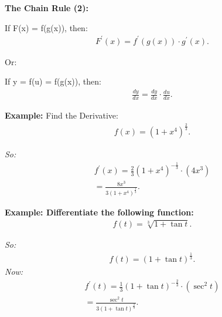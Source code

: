 \documentclass{report}
\begin{document}
  \bigbreak \noindent \bigbreak \noindent 
  \begin{Large}
    \textbf{The Chain Rule (2):}
  \end{Large}
  \bigbreak \noindent 
  If F(x) = f(g(x)), then:
  \begin{align*}
    F^{\prime}(x) = f^{\prime}(g(x)) \cdot g^{\prime}(x)
  .\end{align*}
  \begin{center}
    Or:
  \end{center}
  \bigbreak \noindent 
  If y = f(u) = f(g(x)), then:
  \begin{align*}
    \frac{dy}{dx} = \frac{dy}{dx} \cdot \frac{du}{dx}
  .\end{align*}

  \bigbreak \noindent 
  \begin{mdframed}
    \textbf{Example:} Find the Derivative:
    \begin{align*}
      f(x) = (1+x^{4})^{\frac{2}{3}}
    .\end{align*}
  \end{mdframed}
  \bigbreak \noindent 
  \textit{So:}
  \begin{align*}
    f^{\prime}(x)=\frac{2}{3}(1+x^{4})^{-\frac{1}{3}} \cdot (4x^{3}) \\ 
    = \frac{8x^{3}}{3(1+x^{4})^{\frac{1}{3}}}
  .\end{align*}

  \bigbreak \noindent 
  \begin{mdframed}
    \textbf{Example: Differentiate the following function:}
    \begin{align*}
      f(t) = \sqrt[3]{1+\tan{t}}
    .\end{align*}
  \end{mdframed}
  \bigbreak \noindent 
  \textit{So:}
  \begin{align*}
    f(t) = (1+\tan{t})^{\frac{1}{3}}
  .\end{align*}
  \bigbreak \noindent 
  \textit{Now:}
  \begin{align*}
    f^{\prime}(t) = \frac{1}{3}(1+\tan{t})^{-\frac{2}{3}} \cdot (\sec^2{t}) \\ 
    = \frac{\sec^{2}{t}}{3(1+\tan{t})^{\frac{2}{3}}}
  .\end{align*}
\end{document}
